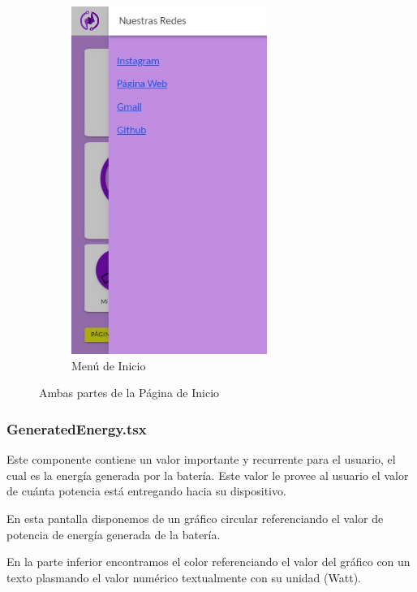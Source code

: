\begin{figure} [H]
\begin{subfigure}{0.4\textwidth}
                            \includegraphics[width=0.7\textwidth]{Imagenes/Aplicación/Start_Menu.jpg}
                            \caption{Menú de Inicio}
                            \label{fig:a2.2}
                        \end{subfigure}
                        \hfill
                                
                        \caption{Ambas partes de la Página de Inicio}
                        \label{fig:a2}
                        \end{figure}
                
                \subsubsection{GeneratedEnergy.tsx}
                    Este componente contiene un valor importante y recurrente para el usuario, el cual es la energía generada por la batería. Este valor le provee al usuario el valor de cuánta potencia está entregando hacia su dispositivo.\par
                    En esta pantalla disponemos de un gráfico circular referenciando el valor de potencia de energía generada de la batería.\par
                    En la parte inferior encontramos el color referenciando el valor del gráfico con un texto plasmando el valor numérico textualmente con su unidad (Watt).\par
    
